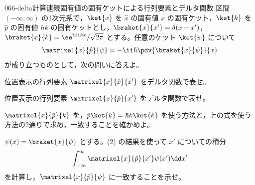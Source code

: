 \documentclass[uplatex,dvipdfmx,a4paper,11pt]{jsarticle}
\begin{document}
\begin{mondai}{066-delta}{計算}{連続固有値の固有ケットによる行列要素とデルタ関数}
区間 $(-\infty,\infty)$ の1次元系で，$\ket{x}$ を $\hat{x}$ の固有値 $x$ の固有ケット，$\ket{k}$ を $\hat{p}$ の固有値 $\hbar k$ の固有ケットとし，$\braket{x}{x'}=\delta(x-x')$，$\braket{x}{k}=\ee^{\ii kx}/\sqrt{2\pi}$ とする。任意のケット $\ket{\psi}$ について
  \[ \matrixel{x}{\hat{p}}{\psi}=-\ii\hbar\pdv{\braket{x}{\psi}}{x} \]
  が成り立つものとして，次の問いに答えよ。
  \begin{shoumon}
    \item 位置表示の行列要素 $\matrixel{x}{\hat{x}}{x'}$ をデルタ関数で表せ。
    \item 位置表示の行列要素 $\matrixel{x}{\hat{p}}{x'}$ をデルタ関数で表せ。
    \item $\matrixel{x}{\hat{p}}{k}$ を，$\hat{p}\ket{k}=\hbar k\ket{k}$ を使う方法と，上の式を使う方法の2通りで求め，一致することを確かめよ。
    \item $\psi(x)=\braket{x}{\psi}$ とする。(2) の結果を使って $x'$ についての積分
    \[ \int_{-\infty}^{\infty}\matrixel{x}{\hat{p}}{x'}\psi(x')\dd x' \]
    を計算し，$\matrixel{x}{\hat{p}}{\psi}$ に一致することを示せ。
  \end{shoumon}


\end{mondai}
\end{document}
